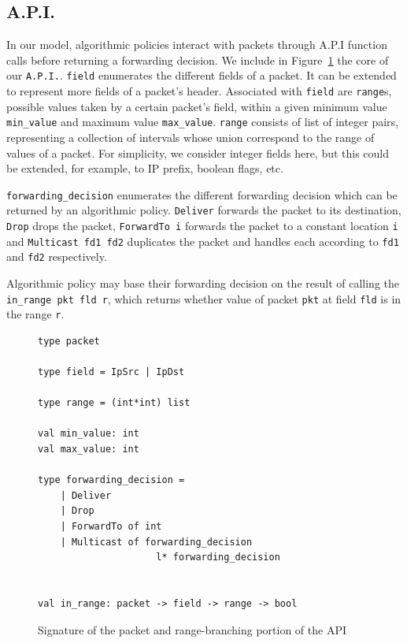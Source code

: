 \documentclass[preprint]{sigplanconf}
\begin{document}
\subsection*{A.P.I.}
In our model, algorithmic policies interact with packets through A.P.I function calls before returning a forwarding decision. We include in Figure~\ref{fig:range_api} the core of our \lstinline|A.P.I.|. 
\lstinline|field| enumerates the different fields of a packet. It can be extended to represent more fields of a packet's header. Associated with \lstinline|field| are \lstinline|range|s, possible values taken by a certain packet's field, within a given minimum value \lstinline|min_value| and maximum value \lstinline|max_value|. \lstinline|range| consists of list of integer pairs, representing a collection of intervals whose union correspond to the range of values of a packet. For simplicity, we consider integer fields here, but this could be extended, for example, to IP prefix, boolean flags, etc.

\lstinline|forwarding_decision| enumerates the different forwarding decision which can be returned by an algorithmic policy. \lstinline|Deliver| forwards the packet to its destination, \lstinline|Drop| drops the packet, \lstinline|ForwardTo i| forwards the packet to a constant location \lstinline|i| and \lstinline|Multicast fd1 fd2| duplicates the packet and handles each according to \lstinline|fd1| and \lstinline|fd2| respectively.

Algorithmic policy may base their forwarding decision on the result of calling the \lstinline|in_range pkt fld r|, which returns whether value of packet \lstinline|pkt| at field \lstinline|fld| is in the range \lstinline|r|.

\begin{figure}[ht]
  \begin{lstlisting}
type packet

type field = IpSrc | IpDst 

type range = (int*int) list

val min_value: int 
val max_value: int

type forwarding_decision =
	| Deliver
	| Drop
	| ForwardTo of int
	| Multicast of forwarding_decision
                     l* forwarding_decision


val in_range: packet -> field -> range -> bool
\end{lstlisting}

\caption{Signature of the packet and range-branching portion of the API}
\label{fig:range_api}
\end{figure}
\end{document}
